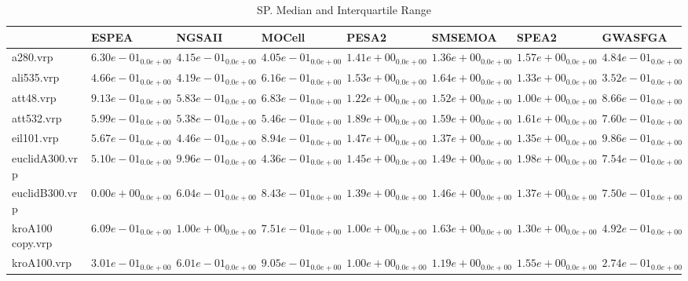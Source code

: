 \documentclass{article}
\begin{document}
\begin{table}
\caption{SP. Median and Interquartile Range}
\label{table: SP}
\centering
\begin{scriptsize}
\begin{tabular}{llllllll}
\hline & ESPEA & NGSAII & MOCell & PESA2 & SMSEMOA & SPEA2 &  GWASFGA\\
\hline 
a280.vrp & $  6.30e-01_{ 0.0e+00}$ & \cellcolor{gray25}$  4.15e-01_{ 0.0e+00}$ & \cellcolor{gray95}$  4.05e-01_{ 0.0e+00}$ & $  1.41e+00_{ 0.0e+00}$ & $  1.36e+00_{ 0.0e+00}$ & $  1.57e+00_{ 0.0e+00}$ & $  4.84e-01_{ 0.0e+00}$ \\
ali535.vrp & $  4.66e-01_{ 0.0e+00}$ & \cellcolor{gray25}$  4.19e-01_{ 0.0e+00}$ & $  6.16e-01_{ 0.0e+00}$ & $  1.53e+00_{ 0.0e+00}$ & $  1.64e+00_{ 0.0e+00}$ & $  1.33e+00_{ 0.0e+00}$ & \cellcolor{gray95}$  3.52e-01_{ 0.0e+00}$ \\
att48.vrp & $  9.13e-01_{ 0.0e+00}$ & \cellcolor{gray95}$  5.83e-01_{ 0.0e+00}$ & \cellcolor{gray25}$  6.83e-01_{ 0.0e+00}$ & $  1.22e+00_{ 0.0e+00}$ & $  1.52e+00_{ 0.0e+00}$ & $  1.00e+00_{ 0.0e+00}$ & $  8.66e-01_{ 0.0e+00}$ \\
att532.vrp & $  5.99e-01_{ 0.0e+00}$ & \cellcolor{gray95}$  5.38e-01_{ 0.0e+00}$ & \cellcolor{gray25}$  5.46e-01_{ 0.0e+00}$ & $  1.89e+00_{ 0.0e+00}$ & $  1.59e+00_{ 0.0e+00}$ & $  1.61e+00_{ 0.0e+00}$ & $  7.60e-01_{ 0.0e+00}$ \\
eil101.vrp & \cellcolor{gray25}$  5.67e-01_{ 0.0e+00}$ & \cellcolor{gray95}$  4.46e-01_{ 0.0e+00}$ & $  8.94e-01_{ 0.0e+00}$ & $  1.47e+00_{ 0.0e+00}$ & $  1.37e+00_{ 0.0e+00}$ & $  1.35e+00_{ 0.0e+00}$ & $  9.86e-01_{ 0.0e+00}$ \\
euclidA300.vrp & \cellcolor{gray25}$  5.10e-01_{ 0.0e+00}$ & $  9.96e-01_{ 0.0e+00}$ & \cellcolor{gray95}$  4.36e-01_{ 0.0e+00}$ & $  1.45e+00_{ 0.0e+00}$ & $  1.49e+00_{ 0.0e+00}$ & $  1.98e+00_{ 0.0e+00}$ & $  7.54e-01_{ 0.0e+00}$ \\
euclidB300.vrp & \cellcolor{gray95}$  0.00e+00_{ 0.0e+00}$ & \cellcolor{gray25}$  6.04e-01_{ 0.0e+00}$ & $  8.43e-01_{ 0.0e+00}$ & $  1.39e+00_{ 0.0e+00}$ & $  1.46e+00_{ 0.0e+00}$ & $  1.37e+00_{ 0.0e+00}$ & $  7.50e-01_{ 0.0e+00}$ \\
kroA100 copy.vrp & \cellcolor{gray25}$  6.09e-01_{ 0.0e+00}$ & $  1.00e+00_{ 0.0e+00}$ & $  7.51e-01_{ 0.0e+00}$ & $  1.00e+00_{ 0.0e+00}$ & $  1.63e+00_{ 0.0e+00}$ & $  1.30e+00_{ 0.0e+00}$ & \cellcolor{gray95}$  4.92e-01_{ 0.0e+00}$ \\
kroA100.vrp & \cellcolor{gray25}$  3.01e-01_{ 0.0e+00}$ & $  6.01e-01_{ 0.0e+00}$ & $  9.05e-01_{ 0.0e+00}$ & $  1.00e+00_{ 0.0e+00}$ & $  1.19e+00_{ 0.0e+00}$ & $  1.55e+00_{ 0.0e+00}$ & \cellcolor{gray95}$  2.74e-01_{ 0.0e+00}$ \\

\end{tabular}
\end{scriptsize}
\end{table}
\end{document}
